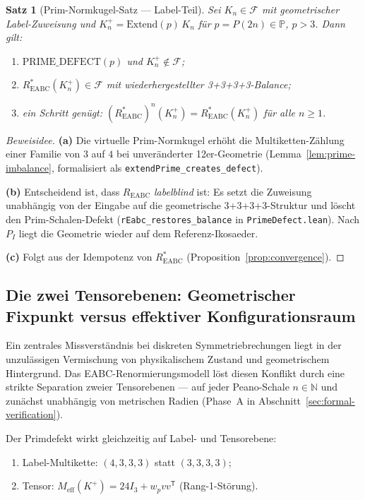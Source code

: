 \documentclass[11pt,a4paper]{article}
\newtheorem{theorem}{Satz}
\begin{document}
\begin{theorem}[Prim-Normkugel-Satz — Label-Teil]
\label{thm:prime-norm}
Sei $K_n\in\mathcal{F}$ mit geometrischer Label-Zuweisung und
$K_n^+=\mathrm{Extend}(p)\,K_n$ für $p=P(2n)\in\mathbb{P}$, $p>3$.
Dann gilt:
\begin{enumerate}
\item[(a)] $\text{PRIME\_DEFECT}(p)$ und $K_n^+\notin\mathcal{F}$;
\item[(b)] $R^*_{\mathrm{EABC}}(K_n^+)\in\mathcal{F}$ mit wiederhergestellter
  3+3+3+3-Balance;
\item[(c)] ein Schritt genügt: $(R^*_{\mathrm{EABC}})^n(K_n^+)=R^*_{\mathrm{EABC}}(K_n^+)$
  für alle $n\ge 1$.
\end{enumerate}
\end{theorem}

\begin{proof}[Beweisidee]
\textbf{(a)} Die virtuelle Prim-Normkugel erhöht die Multiketten-Zählung einer
Familie von $3$ auf $4$ bei unveränderter 12er-Geometrie
(Lemma~\ref{lem:prime-imbalance}, formalisiert als
\texttt{extendPrime\_creates\_defect}).

\smallskip\noindent
\textbf{(b)} Entscheidend ist, dass $R_{\mathrm{EABC}}$ \emph{labelblind} ist:
Es setzt die Zuweisung unabhängig von der Eingabe auf die geometrische
3+3+3+3-Struktur und löscht den Prim-Schalen-Defekt
(\texttt{rEabc\_restores\_balance} in \texttt{PrimeDefect.lean}).
Nach $P_I$ liegt die Geometrie wieder auf dem Referenz-Ikosaeder.

\smallskip\noindent
\textbf{(c)} Folgt aus der Idempotenz von $R^*_{\mathrm{EABC}}$
(Proposition~\ref{prop:convergence}).
\end{proof}

\subsection{Die zwei Tensorebenen: Geometrischer Fixpunkt versus effektiver Konfigurationsraum}
\label{sec:two-levels}

Ein zentrales Missverständnis bei diskreten Symmetriebrechungen liegt in der
unzulässigen Vermischung von physikalischem Zustand und geometrischem Hintergrund.
Das EABC-Renormierungsmodell löst diesen Konflikt durch eine strikte Separation
zweier Tensorebenen --- auf jeder Peano-Schale $n\in\mathbb{N}$ und zunächst
unabhängig von metrischen Radien (Phase~A in Abschnitt~\ref{sec:formal-verification}).

Der Primdefekt wirkt gleichzeitig auf Label- und Tensorebene:
\begin{enumerate}
\item[(L)] Label-Multikette: $(4,3,3,3)$ statt $(3,3,3,3)$;
\item[(T)] Tensor: $M_{\mathrm{eff}}(K^+)=24I_3+w_pvv^{\mathsf T}$ (Rang-1-Störung).
\end{enumerate}
\end{document}
